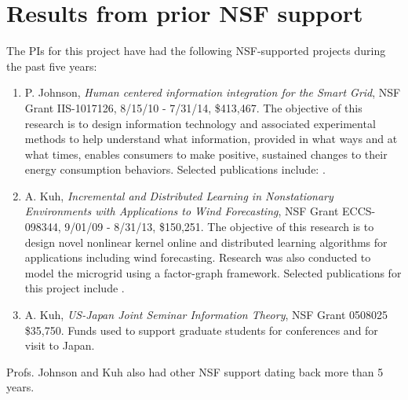 
\section{Results from prior NSF support}

The PIs for this project have had the following NSF-supported projects during the past five years:

\begin{enumerate}
\item P. Johnson, {\em Human centered information integration for the Smart Grid}, NSF
  Grant IIS-1017126, 8/15/10 - 7/31/14, \$413,467. The objective of this
  research is to design information technology and associated experimental
  methods to help understand what information, provided in what ways and at
  what times, enables consumers to make positive, sustained changes to
  their energy consumption behaviors. Selected publications include:
  \cite{csdl2-10-05,csdl2-10-07,csdl2-10-08,csdl2-11-02,csdl2-11-03,csdl2-12-06,csdl2-11-07, csdl2-12-12,csdl2-13-10,csdl2-13-05,csdl2-13-03}.
  
\vspace{-.1in}

\item A. Kuh, {\em Incremental and Distributed Learning in Nonstationary
    Environments with Applications to Wind Forecasting}, NSF Grant ECCS-098344,
  9/01/09 - 8/31/13, \$150,251.  The objective of this research is to
  design novel nonlinear kernel online and distributed learning algorithms
  for applications including wind forecasting.   Research was also conducted
  to model the microgrid using a factor-graph framework. 
  Selected publications for
  this project include \cite{kuh-etal10,kowahl-kuh,hu-etal10,hu-kuh-yang-kavcic,hu-kuh-kavcic-nakafuji,ji-wei-kuh,uddin12,kuh-isess,carland,navid}.
  

\item A. Kuh, {\em US-Japan Joint Seminar Information Theory}, NSF Grant 0508025
  \$35,750.  Funds used to support graduate students for conferences and
  for visit to Japan.

\end{enumerate}


Profs. Johnson and Kuh also had other NSF support dating back more than 5 years.


